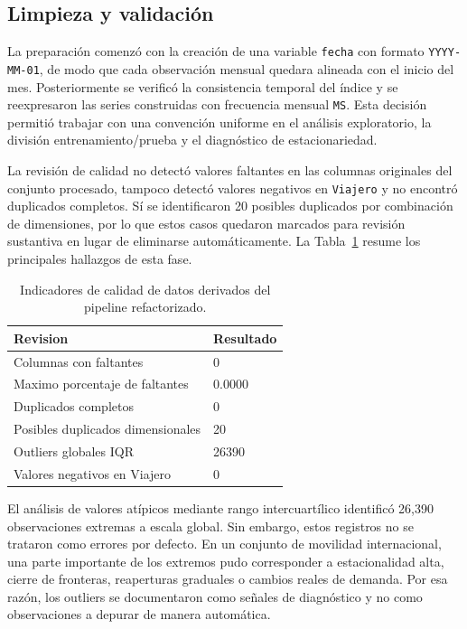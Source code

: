 \documentclass[12pt]{article}
\begin{document}
\subsection{Limpieza y validación}

La preparación comenzó con la creación de una variable \texttt{fecha} con formato \texttt{YYYY-MM-01}, de modo que cada observación mensual quedara alineada con el inicio del mes. Posteriormente se verificó la consistencia temporal del índice y se reexpresaron las series construidas con frecuencia mensual \texttt{MS}. Esta decisión permitió trabajar con una convención uniforme en el análisis exploratorio, la división entrenamiento/prueba y el diagnóstico de estacionariedad.

La revisión de calidad no detectó valores faltantes en las columnas originales del conjunto procesado, tampoco detectó valores negativos en \texttt{Viajero} y no encontró duplicados completos. Sí se identificaron 20 posibles duplicados por combinación de dimensiones, por lo que estos casos quedaron marcados para revisión sustantiva en lugar de eliminarse automáticamente. La Tabla~\ref{tab:calidad-datos} resume los principales hallazgos de esta fase.

\begin{table}[H]
    \centering
    \caption{Indicadores de calidad de datos derivados del pipeline refactorizado.}
    \label{tab:calidad-datos}
    \begin{tabular}{ll}
        \toprule
        Revision & Resultado \\
        \midrule
        Columnas con faltantes & 0 \\
        Maximo porcentaje de faltantes & 0.0000 \\
        Duplicados completos & 0 \\
        Posibles duplicados dimensionales & 20 \\
        Outliers globales IQR & 26390 \\
        Valores negativos en Viajero & 0 \\
        \bottomrule
    \end{tabular}
\end{table}

El análisis de valores atípicos mediante rango intercuartílico identificó 26{,}390 observaciones extremas a escala global. Sin embargo, estos registros no se trataron como errores por defecto. En un conjunto de movilidad internacional, una parte importante de los extremos pudo corresponder a estacionalidad alta, cierre de fronteras, reaperturas graduales o cambios reales de demanda. Por esa razón, los outliers se documentaron como señales de diagnóstico y no como observaciones a depurar de manera automática.
\end{document}
